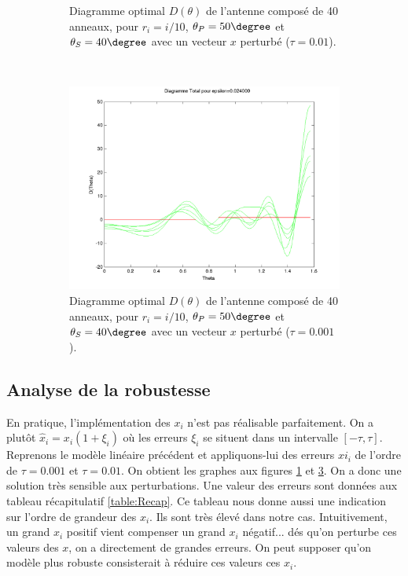 \begin{figure}[h!]
\begin{subfigure}[b]{0.32\textwidth}
  \caption{Diagramme optimal $D(\theta)$ de l'antenne composé de 40 anneaux, pour $r_i=i/10$, $\theta_P=50 \degree$ et $\theta_S=40 \degree$ avec un vecteur $x$ perturbé ($\tau = 0.01$).}
  \label{fig:D-ModLin-RobustTau01}
  \end{subfigure}
   ~ 
  \begin{subfigure}[b]{0.32\textwidth}
  \includegraphics[width=\textwidth]{D-ModLin-2RobustTau001.png}
  \caption{Diagramme optimal $D(\theta)$ de l'antenne composé de 40 anneaux, pour $r_i=i/10$, $\theta_P=50 \degree$ et $\theta_S=40 \degree$ avec un vecteur $x$ perturbé ($\tau=0.001$).}
  \label{fig:D-ModLin-RobustTau001}
  \end{subfigure}
  \caption{}
  \end{figure}


\subsection{Analyse de la robustesse}
En pratique, l'implémentation des $x_i$ n'est pas réalisable parfaitement. On a plutôt $\hat{x}_i = x_i(1+\xi_i)$ où les erreurs $\xi_i$ se situent dans un intervalle $[-\tau,\tau]$.\\
Reprenons le modèle linéaire précédent et appliquons-lui des erreurs $xi_i$ de l'ordre de $\tau=0.001$ et $\tau=0.01$. On obtient les graphes aux figures \ref{fig:D-ModLin-RobustTau01} et \ref{fig:D-ModLin-RobustTau001}. On a donc une solution très sensible aux perturbations. Une valeur des erreurs sont données aux tableau récapitulatif \ref{table:Recap}. Ce tableau nous donne aussi une indication sur l'ordre de grandeur des $x_i$. Ils sont très élevé dans notre cas. Intuitivement, un grand $x_i$ positif vient compenser un grand $x_i$ négatif... dés qu'on perturbe ces valeurs des $x$, on a directement de grandes erreurs. On peut supposer qu'on modèle plus robuste consisterait à réduire ces valeurs ces $x_i$.









